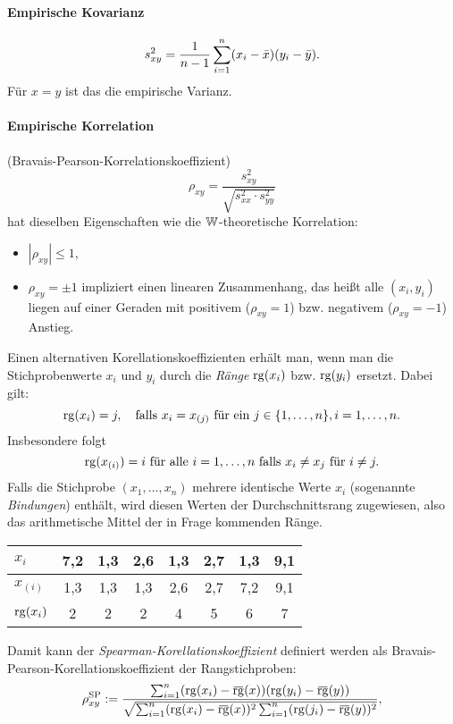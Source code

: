 \paragraph{Empirische Kovarianz}
\[ s_{xy}^2 = \frac{1}{n-1} \sum_{i=1}^n (x_i - \bar{x})(y_i - \bar{y}). \]
Für $x=y$ ist das die empirische Varianz.

\paragraph{Empirische Korrelation}
(Bravais-Pearson-Korrelationskoeffizient)
\[ \rho_{xy} = \frac{ s_{xy}^2 }{ \sqrt{ s_{xx}^2 \cdot s_{yy}^2 } } \]
hat dieselben Eigenschaften wie die $\mathbb{W}$-theoretische Korrelation:
\begin{itemize}
\item $|\rho_{xy}| \le 1$,
\item $\rho_{xy} = \pm 1$ impliziert einen linearen Zusammenhang, das heißt alle
  $(x_i, y_i)$ liegen auf einer Geraden mit positivem ($\rho_{xy} = 1$) bzw.
  negativem ($\rho_{xy} = -1$) Anstieg.
\end{itemize}
Einen alternativen Korellationskoeffizienten erhält man, wenn man die
Stichprobenwerte $x_i$ und $y_i$ durch die \emph{Ränge} $\operatorname{rg}(x_i)$ bzw.
$\operatorname{rg}(y_i)$ ersetzt. Dabei gilt:
\[ \operatorname{rg}(x_i) = j, \quad \text{falls } x_i = x_{(j)} \text{ für ein } j \in \{ 1,
  \ldots, n \}, i = 1, \ldots, n. \]
Insbesondere folgt
\[ \operatorname{rg}(x_{(i)}) = i \text{ für alle } i = 1, \ldots, n \text{ falls } x_i \ne
  x_j \text{ für } i \ne j. \]
Falls die Stichprobe $(x_1, \ldots, x_n)$ mehrere identische Werte $x_i$
(sogenannte \emph{Bindungen}) enthält, wird diesen Werten der Durchschnittsrang
zugewiesen, also das arithmetische Mittel der in Frage kommenden Ränge.
\begin{center}
  \begin{tabular}{l|ccccccc}
    $x_i$ & 7,2 & 1,3 & 2,6 & 1,3 & 2,7 & 1,3 & 9,1 \\
    \hline
    $x_{(i)}$ & 1,3 & 1,3 & 1,3 & 2,6 & 2,7 & 7,2 & 9,1 \\
    $\operatorname{rg}(x_i)$ & 2 & 2 & 2 & 4 & 5 & 6 & 7
  \end{tabular}
\end{center}
Damit kann der \emph{Spearman-Korellationskoeffizient} definiert werden als
Bravais-Pearson-Korellationskoeffizient der Rangstichproben:
\[ \rho_{xy}^{\mathrm{SP}} := \frac{
    \sum_{i=1}^n (\rg(x_i) - \obar{\rg}(x)) (\rg(y_i) - \obar{\rg}(y))
  }
  {
    \sqrt{
      \sum_{i=1}^n (\rg(x_i) - \obar{\rg}(x))^2
      \sum_{i=1}^n (\rg(j_i) - \obar{\rg}(y))^2
    }
  },
\]
